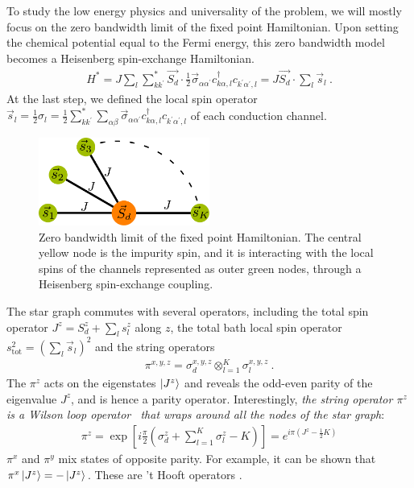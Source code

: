 \documentclass[reprint,prb,superscriptaddress]{revtex4-2}
\begin{document}
To study the low energy physics and universality of the problem, we will mostly focus on the zero bandwidth limit of the fixed point Hamiltonian. Upon setting the chemical potential equal to the Fermi energy, this zero bandwidth model becomes a Heisenberg spin-exchange Hamiltonian.
\begin{equation}\begin{aligned}
	\label{stargraph}
	H^* = J\sum_l\sum_{kk^\prime}^* \vec{S_d}\cdot\frac{1}{2}\vec{\sigma}_{\alpha\alpha^\prime}c_{k\alpha,l}^\dagger c_{k^\prime\alpha^\prime, l} = J\vec{S_d}\cdot\sum_l \vec{s}_l~.
\end{aligned}\end{equation}
At the last step, we defined the local spin operator \(\vec{s}_l = \frac{1}{2}\sigma_l = \frac{1}{2}\sum_{kk^\prime}^*\sum_{\alpha\beta}\vec{\sigma}_{\alpha\alpha^\prime}c_{k\alpha,l}^\dagger c_{k^\prime\alpha^\prime, l}\) of each conduction channel.
\begin{figure}[!htpb]
	\centering
	\includegraphics[width=0.5\textwidth]{./stargraph.pdf}
	\caption{Zero bandwidth limit of the fixed point Hamiltonian. The central yellow node is the impurity spin, and it is interacting with the local spins of the channels represented as outer green nodes, through a Heisenberg spin-exchange coupling.}
	\label{stargraph_fig}
\end{figure}
The star graph commutes with several operators, including the total spin operator \(J^z = S_d^z + \sum_l s_l^z\) along \(z\), the total bath local spin operator \(s^2_\text{tot} = \left(\sum_l \vec s_l\right)^2\) and the string operators 
\begin{equation}\begin{aligned}
\pi^{x,y,z} = \sigma_d^{x,y,z} \otimes_{l=1}^K \sigma_l^{x,y,z}~.
\end{aligned}\end{equation}
The \(\pi^z\) acts on the eigenstates \(\ket{J^z}\) and reveals the odd-even parity of the eigenvalue \(J^z\), and is hence a parity operator. Interestingly, \textit{the string operator \(\pi^z\) is a Wilson loop operator~\cite{fradkin2013field} that wraps around all the nodes of the star graph}:
\begin{equation}\begin{aligned}
	\label{w_loop}
	\pi^z = \exp\left[i \frac{\pi}{2} \left(\sigma_d^z + \sum_{l=1}^K \sigma^z_l - K\right)\right] = e^{i \pi \left(J^z - \frac{1}{2}K\right)}
\end{aligned}\end{equation}
\(\pi^x\) and \(\pi^y\) mix states of opposite parity. For example, it can be shown that \(\pi^x \ket{J^z} = -\ket{J^z}\). These are 't Hooft operators \cite{fradkin2013field}.
\end{document}
